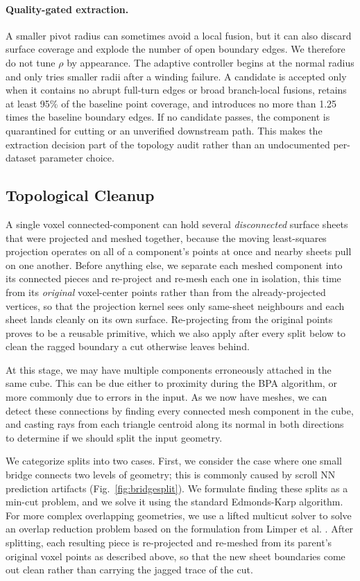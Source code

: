 \paragraph{Quality-gated extraction.}
A smaller pivot radius can sometimes avoid a local fusion, but it can also discard surface coverage and explode the number of open boundary edges. We therefore do not tune $\rho$ by appearance. The adaptive controller begins at the normal radius and only tries smaller radii after a winding failure. A candidate is accepted only when it contains no abrupt full-turn edges or broad branch-local fusions, retains at least 95\% of the baseline point coverage, and introduces no more than 1.25 times the baseline boundary edges. If no candidate passes, the component is quarantined for cutting or an unverified downstream path. This makes the extraction decision part of the topology audit rather than an undocumented per-dataset parameter choice.

\subsection{Topological Cleanup}
\label{sec:cleanup}

A single voxel connected-component can hold several {\em disconnected} surface sheets that were projected and meshed together, because the moving least-squares projection operates on all of a component's points at once and nearby sheets pull on one another. Before anything else, we separate each meshed component into its connected pieces and re-project and re-mesh each one in isolation, this time from its {\em original} voxel-center points rather than from the already-projected vertices, so that the projection kernel sees only same-sheet neighbours and each sheet lands cleanly on its own surface. Re-projecting from the original points proves to be a reusable primitive, which we also apply after every split below to clean the ragged boundary a cut otherwise leaves behind.

At this stage, we may have multiple components erroneously attached in the same cube. This can be due either to proximity during the BPA algorithm, or more commonly due to errors in the input. As we now have meshes, we can detect these connections by finding every connected mesh component in the cube, and casting rays from each triangle centroid along its normal in both directions to determine if we should split the input geometry.

We categorize splits into two cases. First, we consider the case where one small bridge connects two levels of geometry; this is commonly caused by scroll NN prediction artifacts (Fig.~\ref{fig:bridgesplit}). We formulate finding these splits as a min-cut problem, and we solve it using the standard Edmonds-Karp algorithm. For more complex overlapping geometries, we use a lifted multicut solver \cite{keuper2015efficient} to solve an overlap reduction problem based on the formulation from Limper et al. \cite{limper2018box}. After splitting, each resulting piece is re-projected and re-meshed from its parent's original voxel points as described above, so that the new sheet boundaries come out clean rather than carrying the jagged trace of the cut.

